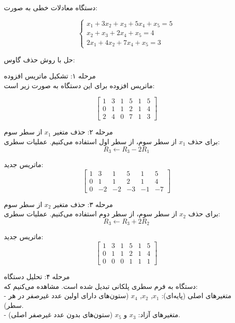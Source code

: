 \begin{example}[]
	 دستگاه معادلات خطی به صورت:
	
	\[
	\begin{cases}
		x_1 + 3x_2 + x_3 + 5x_4 + x_5 = 5 \\
		x_2 + x_3 + 2x_4 + x_5 = 4 \\
		2x_1 + 4x_2 + 7x_4 + x_5 = 3
	\end{cases}
	\]
	
	 حل با روش حذف گاوس:
	
	مرحله ۱: تشکیل ماتریس افزوده  \\
	ماتریس افزوده برای این دستگاه به صورت زیر است:
	
	\[
	\left[
	\begin{array}{ccccc|c}
		1 & 3 & 1 & 5 & 1 & 5 \\
		0 & 1 & 1 & 2 & 1 & 4 \\
		2 & 4 & 0 & 7 & 1 & 3
	\end{array}
	\right]
	\]
	
	
	مرحله ۲: حذف متغیر \(x_1\) از سطر سوم  \\
	برای حذف \(x_1\) از سطر سوم، از سطر اول استفاده می‌کنیم. عملیات سطری:
	\[
	R_3 \leftarrow R_3 - 2R_1
	\]
	
	ماتریس جدید:
	\[
	\left[
	\begin{array}{ccccc|c}
		1 & 3 & 1 & 5 & 1 & 5 \\
		0 & 1 & 1 & 2 & 1 & 4 \\
		0 & -2 & -2 & -3 & -1 & -7
	\end{array}
	\right]
	\]
	
	
	مرحله ۳: حذف متغیر \(x_2\) از سطر سوم \\ 
	برای حذف \(x_2\) از سطر سوم، از سطر دوم استفاده می‌کنیم. عملیات سطری:
	\[
	R_3 \leftarrow R_3 + 2R_2
	\]
	
	ماتریس جدید:
	\[
	\left[
	\begin{array}{ccccc|c}
		1 & 3 & 1 & 5 & 1 & 5 \\
		0 & 1 & 1 & 2 & 1 & 4 \\
		0 & 0 & 0 & 1 & 1 & 1
	\end{array}
	\right]
	\]
	
	
	مرحله ۴: تحلیل دستگاه  \\
	دستگاه به فرم سطری پلکانی  تبدیل شده است. مشاهده می‌کنیم که:\\
	- متغیرهای اصلی (پایه‌ای): \(x_1\), \(x_2\), \(x_4\) (ستون‌های دارای اولین عدد غیرصفر در هر سطر).\\
	- متغیرهای آزاد: \(x_3\) و \(x_5\) (ستون‌های بدون عدد غیرصفر اصلی).\\
	


\end{example}
